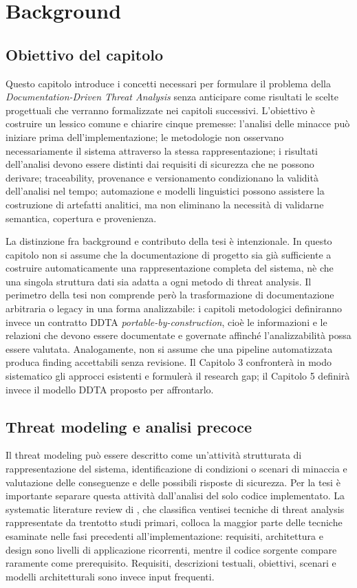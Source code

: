 \documentclass[12pt,a4paper,oneside]{report}
\newcommand{\ddta}{\textit{Documentation-Driven Threat Analysis}}
\begin{document}
\chapter{Background}

\section*{Obiettivo del capitolo}

Questo capitolo introduce i concetti necessari per formulare il problema della \ddta{} senza anticipare come risultati le scelte progettuali che verranno formalizzate nei capitoli successivi. L'obiettivo è costruire un lessico comune e chiarire cinque premesse: l'analisi delle minacce può iniziare prima dell'implementazione; le metodologie non osservano necessariamente il sistema attraverso la stessa rappresentazione; i risultati dell'analisi devono essere distinti dai requisiti di sicurezza che ne possono derivare; traceability, provenance e versionamento condizionano la validità dell'analisi nel tempo; automazione e modelli linguistici possono assistere la costruzione di artefatti analitici, ma non eliminano la necessità di validarne semantica, copertura e provenienza.

La distinzione fra background e contributo della tesi è intenzionale. In questo capitolo non si assume che la documentazione di progetto sia già sufficiente a costruire automaticamente una rappresentazione completa del sistema, nè che una singola struttura dati sia adatta a ogni metodo di threat analysis. Il perimetro della tesi non comprende però la trasformazione di documentazione arbitraria o legacy in una forma analizzabile: i capitoli metodologici definiranno invece un contratto DDTA \emph{portable-by-construction}, cioè le informazioni e le relazioni che devono essere documentate e governate affinché l'analizzabilità possa essere valutata. Analogamente, non si assume che una pipeline automatizzata produca finding accettabili senza revisione. Il Capitolo 3 confronterà in modo sistematico gli approcci esistenti e formulerà il research gap; il Capitolo 5 definirà invece il modello DDTA proposto per affrontarlo.

\section{Threat modeling e analisi precoce}

Il threat modeling può essere descritto come un'attività strutturata di rappresentazione del sistema, identificazione di condizioni o scenari di minaccia e valutazione delle conseguenze e delle possibili risposte di sicurezza. Per la tesi è importante separare questa attività dall'analisi del solo codice implementato. La systematic literature review di \citet{tuma2018threatanalysis}, che classifica ventisei tecniche di threat analysis rappresentate da trentotto studi primari, colloca la maggior parte delle tecniche esaminate nelle fasi precedenti all'implementazione: requisiti, architettura e design sono livelli di applicazione ricorrenti, mentre il codice sorgente compare raramente come prerequisito. Requisiti, descrizioni testuali, obiettivi, scenari e modelli architetturali sono invece input frequenti.
\end{document}
